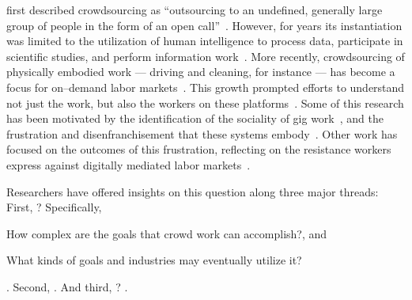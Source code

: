 \documentclass[trackingWork]{subfiles}
\begin{document}
\citeauthor{howe2008crowdsourcing} first described crowdsourcing as
``outsourcing to an undefined, generally large group of people in the form of an open call''~\cite{howe2008crowdsourcing}.
However, for years its instantiation was limited to the utilization of
human intelligence to process data, participate in scientific studies, and perform information work~\cite{CrowdsourcingUserStudies,movieSummarizationWu,yuenSurvey,geiger2011managing,quinnbedersonTaxonomy}.
More recently, crowdsourcing of physically embodied work
--- driving and cleaning, for instance ---
has become a focus for on--demand labor markets~\cite{uberAlgorithm,uberOfficial,zaarlyOfficial,taskrabbitOfficial}.
This growth prompted efforts to understand not just the work, but also the workers on these platforms~\cite{Ross,whoareNOTtheTurkers}.
Some of this research has been motivated by the identification of the sociality of gig work~\cite{crowdcollab},
and the frustration and disenfranchisement that these systems embody~\cite{turkopticon,martin2014being,takingAHITMcInnis}.
Other work has focused on the outcomes of this frustration,
reflecting on the resistance workers express against digitally mediated labor markets~\cite{uberAlgorithm,dynamo}.

Researchers have offered insights on this question along three major threads:
First, ?
      Specifically,
      \begin{inlinelist}[label=(\alph*)]
        \item How complex are the goals that crowd work can accomplish?, and
        \item What kinds of goals and industries may eventually utilize it?
      \end{inlinelist}
      \cite{foundry,suzukiAtelier,KimStoria,yuanAlmost,YuEncouragingOutside,
            Nebeling:2016:WCW:2858036.2858169,
            Hahn:2016:KAB:2858036.2858364}.
Second, 
      \cite{embracingErrorKrishna,bernsteinSoylent,sensitiveTasks,
            LykourentzouPersonalityMatters,KucherbaevReLauncher,
            Law:2016:CKC:2858036.2858144,Cai:2016:CRI:2858036.2858237,
            Chang:2016:ACC:2858036.2858411,Newell:2016:OMA:2858036.2858490}.
And third, ?
      \cite{turkopticon,storiesIraniSilberman,dynamo,crowdcollab,
            whyWouldAnyoneBrewer,takingAHITMcInnis}.
\end{document}
